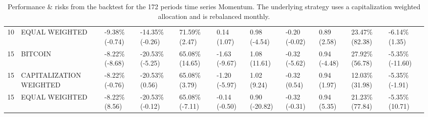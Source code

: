\documentclass{article}
\begin{document}
\begin{landscape}
\begin{table}[H]
\begin{tabular}{p{0.4cm}|p{3cm}|p{1.65cm}|p{1.65cm}|p{1.65cm}|p{1.65cm}|p{1.65cm}|p{1.65cm}|p{1.65cm}|p{1.65cm}|p{1.65cm}}
\\ 
10&EQUAL WEIGHTED&-9.38\% (-0.74)&-14.35\% (-0.26)&71.59\% (2.47)&0.14 (1.07)&0.98 (-4.54)&-0.20 (-0.02)&0.89 (2.58)&23.47\% (82.38)&-6.14\% (1.35)
\\ 
15&BITCOIN&-8.22\% (-8.68)&-20.53\% (-5.25)&65.08\% (14.65)&-1.63 (-9.67)&1.08 (11.61)&-0.32 (-5.62)&0.94 (-4.48)&27.92\% (56.78)&-5.35\% (-11.60)
\\ 
15&CAPITALIZATION WEIGHTED&-8.22\% (-0.76)&-20.53\% (0.56)&65.08\% (3.79)&-1.20 (-5.97)&1.02 (9.24)&-0.32 (0.54)&0.94 (1.97)&12.03\% (31.98)&-5.35\% (-1.91)
\\ 
15&EQUAL WEIGHTED&-8.22\% (8.56)&-20.53\% (-0.12)&65.08\% (-7.11)&-0.14 (-0.50)&0.90 (-20.82)&-0.32 (-0.31)&0.94 (5.35)&21.23\% (77.84)&-5.35\% (10.71)
\\ 
\bottomrule
  \end{tabular}
  \label{tab:tsmom172capiweight}
   \caption{Performance \& risks from the backtest for the 172 periods time series Momentum. The underlying strategy uses a capitalization weighted allocation and is rebalanced monthly.}
\end{table}
\end{landscape}
\end{document}
